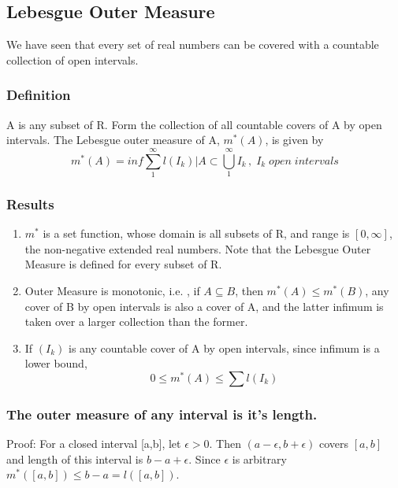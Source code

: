 \documentclass{article}
\begin{document}
\subsection{Lebesgue Outer Measure}

We have seen that every set of real numbers can be covered with a countable collection of open intervals.

\subsubsection{Definition}

A is any subset of R. Form the collection of all countable covers of A by open intervals. The Lebesgue outer measure of A, $m^*(A)$, is given by
$$m^*(A)= inf{\sum_{1}^{\infty}l(I_k)| A \subset \bigcup_{1}^{\infty} I_k \, , \; I_k \; open \; intervals}$$

\subsubsection{Results}
\begin{enumerate}
    \item $m^*$ is a set function, whose domain is all subsets of R, and range is $[0,\infty]$, the non-negative extended real numbers. Note that the Lebesgue Outer Measure is defined for every subset of R.
    
    \item Outer Measure is monotonic, i.e. , if $A \subseteq B$, then $m^*(A) \leq m^*(B)$, any cover of B by open intervals is also a cover of A, and the latter infimum is taken over a larger collection than the former. 

    \item If $(I_k)$ is any countable cover of A by open intervals, since infimum is a lower bound,$$ 0 \leq m^*(A) \leq \sum l(I_k)$$
    


\end{enumerate}

\subsubsection{The outer measure of any interval is it's length.}

Proof:  
For a closed interval [a,b], let $\epsilon >0$. Then $(a-\epsilon,b+\epsilon)$ covers $[a,b]$ and length of this interval is $b-a+\epsilon$. Since $\epsilon$ is arbitrary $m^*([a,b]) \leq b-a = l([a,b])$.
\end{document}
